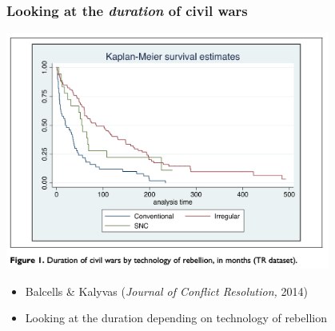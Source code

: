 \documentclass[utf8, xcolor=dvipsnames]{beamer}
\begin{document}
\begin{frame}
\frametitle{Looking at the \textit{duration} of civil wars}
\centering

\includegraphics[width = 0.8\textwidth]{img/balcells_kalyvas_duration}


\begin{itemize}
  \item Balcells \& Kalyvas (\textit{Journal of Conflict Resolution,} 2014)
  \item Looking at the duration depending on technology of rebellion
\end{itemize}


\end{frame}
\end{document}

